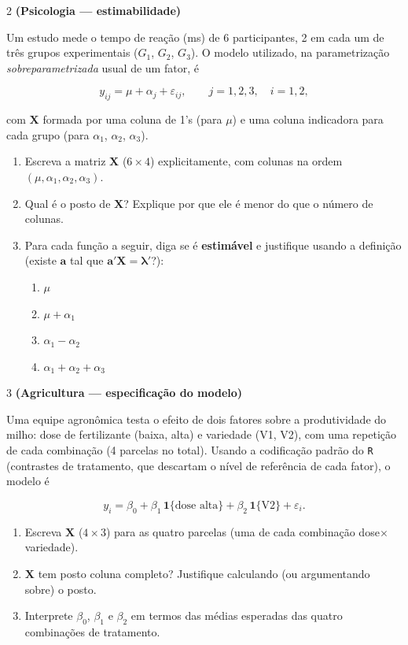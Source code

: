 \documentclass[11pt]{article}
\begin{document}
\begin{questao}{2} \textbf{(Psicologia --- estimabilidade)}

Um estudo mede o tempo de reação (ms) de 6 participantes, 2 em cada um de três grupos
experimentais ($G_1$, $G_2$, $G_3$). O modelo utilizado, na parametrização
\emph{sobreparametrizada} usual de um fator, é

$$
y_{ij} = \mu + \alpha_j + \varepsilon_{ij}, \qquad j = 1,2,3, \quad i = 1,2,
$$

com $\mathbf{X}$ formada por uma coluna de 1's (para $\mu$) e uma coluna indicadora para cada
grupo (para $\alpha_1$, $\alpha_2$, $\alpha_3$).

\begin{enumerate}[label=(\alph*)]
  \item Escreva a matriz $\mathbf{X}$ ($6 \times 4$) explicitamente, com colunas na ordem $(\mu,
    \alpha_1, \alpha_2, \alpha_3)$.
  \item Qual é o posto de $\mathbf{X}$? Explique por que ele é menor do que o número de colunas.
  \item Para cada função a seguir, diga se é \textbf{estimável} e justifique usando a definição
    (existe $\mathbf{a}$ tal que $\mathbf{a}'\mathbf{X} = \boldsymbol\lambda'$?):
    \begin{enumerate}[label=(\roman*)]
      \item $\mu$
      \item $\mu + \alpha_1$
      \item $\alpha_1 - \alpha_2$
      \item $\alpha_1 + \alpha_2 + \alpha_3$
    \end{enumerate}
\end{enumerate}
\end{questao}

\begin{questao}{3} \textbf{(Agricultura --- especificação do modelo)}

Uma equipe agronômica testa o efeito de dois fatores sobre a produtividade do milho: dose de
fertilizante (baixa, alta) e variedade (V1, V2), com uma repetição de cada combinação (4 parcelas
no total). Usando a codificação padrão do \texttt{R} (contrastes de tratamento, que descartam o
nível de referência de cada fator), o modelo é

$$
y_i = \beta_0 + \beta_1 \, \mathbf{1}\{\text{dose alta}\} + \beta_2\, \mathbf{1}\{\text{V2}\} +
\varepsilon_i.
$$

\begin{enumerate}[label=(\alph*)]
  \item Escreva $\mathbf{X}$ ($4 \times 3$) para as quatro parcelas (uma de cada combinação
    dose$\times$variedade).
  \item $\mathbf{X}$ tem posto coluna completo? Justifique calculando (ou argumentando sobre) o
    posto.
  \item Interprete $\beta_0$, $\beta_1$ e $\beta_2$ em termos das médias esperadas das quatro
    combinações de tratamento.
\end{enumerate}
\end{questao}
\end{document}
